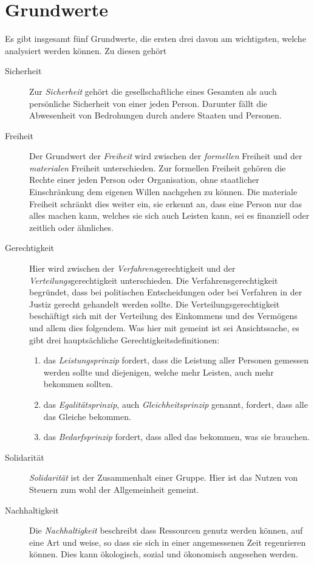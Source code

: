 \documentclass{article}
\begin{document}
\section{Grundwerte}
Es gibt insgesamt fünf Grundwerte, die ersten drei davon am wichtigsten, welche analysiert werden können. Zu diesen gehört
\begin{description}
 \item[Sicherheit] Zur \emph{Sicherheit} gehört die gesellschaftliche eines Gesamten als auch persönliche Sicherheit von einer jeden Person. Darunter fällt die Abwesenheit von Bedrohungen durch andere Staaten und Personen.
 \item[Freiheit] Der Grundwert der \emph{Freiheit} wird zwischen der \emph{formellen} Freiheit und der \emph{materialen} Freiheit unterschieden. Zur formellen Freiheit gehören die Rechte einer jeden Person oder Organisation, ohne staatlicher Einschränkung dem eigenen Willen nachgehen zu können. Die materiale Freiheit schränkt dies weiter ein, sie erkennt an, dass eine Person nur das alles machen kann, welches sie sich auch Leisten kann, sei es finanziell oder zeitlich oder ähnliches.
 \item[Gerechtigkeit] Hier wird zwischen der \emph{Verfahrens}gerechtigkeit und der \emph{Verteilungs}gerechtigkeit unterschieden. Die Verfahrensgerechtigkeit begründet, dass bei politischen Entscheidungen oder bei Verfahren in der Justiz gerecht gehandelt werden sollte. Die Verteilungsgerechtigkeit beschäftigt sich mit der Verteilung des Einkommens und des Vermögens und allem dies folgendem. Was hier mit  gemeint ist sei Ansichtssache, es gibt drei hauptsächliche Gerechtigkeitsdefinitionen:
 \begin{enumerate}
  \item das \emph{Leistungsprinzip} fordert, dass die Leistung aller Personen gemessen werden sollte und diejenigen, welche mehr Leisten, auch mehr bekommen sollten.
  \item das \emph{Egalitätsprinzip}, auch \emph{Gleichheitsprinzip} genannt, fordert, dass alle das Gleiche bekommen.
  \item das \emph{Bedarfsprinzip} fordert, dass alled das bekommen, was sie brauchen.
 \end{enumerate}
 \item[Solidarität] \emph{Solidarität} ist der Zusammenhalt einer Gruppe. Hier ist das Nutzen von Steuern zum wohl der Allgemeinheit gemeint.
 \item[Nachhaltigkeit] Die \emph{Nachhaltigkeit} beschreibt dass Ressourcen genutz werden können, auf eine Art und weise, so dass sie sich in einer angemessenen Zeit regenrieren können. Dies kann ökologisch, sozial und ökonomisch angesehen werden.  
\end{description} 
\end{document}
